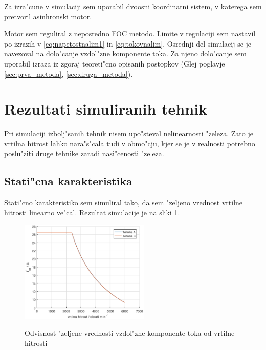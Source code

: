 \documentclass[journal,a4paper,twoside]{sty/IEEEtran}
\begin{document}
Za izra"cune v simulaciji sem uporabil dvoosni koordinatni sistem, v katerega sem pretvoril asinhronski motor.




Motor sem reguliral z neposredno FOC metodo. Limite v regulaciji sem nastavil po izrazih v \ref{eq:napetostnalim1} in \ref{eq:tokovnalim}.
Osrednji del simulacij se je navezoval na dolo"canje vzdol"zne komponente toka. Za njeno dolo"canje sem uporabil izraza iz zgoraj teoreti"cno opisanih postopkov (Glej poglavje \ref{sec:prva_metoda}, \ref{sec:druga_metoda}).

\section{Rezultati simuliranih tehnik}

Pri simulaciji izbolj"sanih tehnik nisem upo"steval nelinearnosti "zeleza. Zato je vrtilna hitrost lahko nara"s"cala tudi v obmo"cju, kjer se je v realnosti potrebno poslu"ziti druge tehnike zaradi nasi"cenosti "zeleza.

\subsection{Stati"cna karakteristika}

Stati"cno karakteristiko sem simuliral tako, da sem "zeljeno vrednost vrtilne hitrosti linearno ve"cal. Rezultat simulacije je na sliki \ref{fig:static}.

\begin{figure}
\includegraphics[width=0.55\textwidth]{fig_static.eps}
\label{fig:static}
\caption{Odvisnost "zeljene vrednosti vzdol"zne komponente toka od vrtilne hitrosti}
\end{figure}
\end{document}
